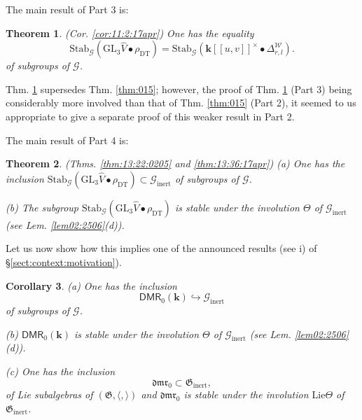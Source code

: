 \documentclass[10pt]{amsart}
\newtheorem{thm}{Theorem}[section]
\newtheorem{cor}[thm]{Corollary}
\numberwithin{equation}{subsection}
\begin{document}
The main result of Part 3 is: 
\begin{thm} \label{thm:016} (Cor. \ref{cor:11:2:17apr}) %
One has the equality
$$
\mathrm{Stab}_{\mathcal G}(\mathrm{GL}_3\hat V\bullet \rho_{\mathrm{DT}}
)=
\mathrm{Stab}_{\mathcal G}(\mathbf k[[u,v]]^\times\bullet\Delta^{\mathcal W}_{r,l}
).
$$
of subgroups of $\mathcal G$.
\end{thm}

Thm. \ref{thm:016} supersedes Thm. \ref{thm:015}; however, the proof of Thm. \ref{thm:016} (Part 3) 
being considerably more involved than that of Thm. \ref{thm:015} (Part 2), it seemed to us appropriate 
to give a separate proof of this weaker result in Part 2. 

The main result of Part 4 is: 

\begin{thm} \label{thm:014}(Thms. \ref{thm:13:22:0205} and \ref{thm:13:36:17apr}) %
(a) One has the inclusion
$\mathrm{Stab}_{\mathcal G}(\mathrm{GL}_3\hat V\bullet \rho_{\mathrm{DT}}
)\subset \mathcal G_{\mathrm{inert}}$ 
of subgroups of $\mathcal G$. 

(b) The subgroup $\mathrm{Stab}_{\mathcal G}(\mathrm{GL}_3\hat V\bullet \rho_{\mathrm{DT}}
)$ is stable under the involution 
$\Theta$ of $\mathcal G_{\mathrm{inert}}$ (see Lem. \ref{lem02:2506}(d)).
\end{thm}

Let us now show how this implies one of the announced results (see i) of \S\ref{sect:context:motivation}).  

\begin{cor}\label{main:cor}
(a)  One has the inclusion 
$$%
\mathsf{DMR}_0(\mathbf k)\hookrightarrow\mathcal{G}_{\mathrm{inert}} 
$$%
of subgroups of $\mathcal G$. 

(b) $\mathsf{DMR}_0(\mathbf k)$ is stable under the involution $\Theta$ of $\mathcal{G}_{\mathrm{inert}}$
(see Lem. \ref{lem02:2506}(d)). 

(c) One has the inclusion 
$$
\mathfrak{dmr}_0\subset\mathfrak G_{\mathrm{inert}}, 
$$
of Lie subalgebras of $(\mathfrak G,\langle,\rangle)$ and $\mathfrak{dmr}_0$ is stable
under the involution $\mathrm{Lie}\Theta$ of $\mathfrak G_{\mathrm{inert}}$.   
 \end{cor}  
\end{document}
